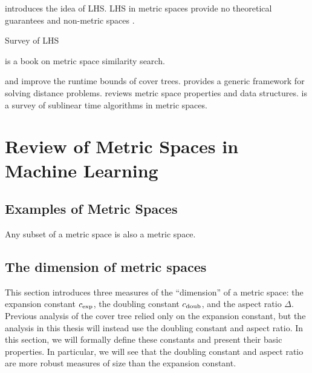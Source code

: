 \documentclass[../main.tex]{subfiles}
\newcommand{\aspect}[1]{\Delta}
\newcommand{\krnum}{c_\textnormal{exp}}
\newcommand{\doubnum}{c_\textnormal{doub}}
\begin{document}
\cite{gionis1999similarity} introduces the idea of LHS.
LHS in metric spaces \cite{tellez2010locality,novak2010locality} provide no theoretical guarantees and non-metric spaces \cite{mu2010non}.

Survey of LHS \cite{wang2014hashing} \cite{wang2016learning}

\cite{zezula2006similarity} is a book on metric space similarity search.

\cite{ram2009linear} and \cite{curtin2015plug} improve the runtime bounds of cover trees.
\cite{curtin2013tree} provides a generic framework for solving distance problems.
\cite{clarkson2006nearest} reviews metric space properties and data structures.
\cite{czumaj2010sublinear} is a survey of sublinear time algorithms in metric spaces.


\section{Review of Metric Spaces in Machine Learning}


\subsection{Examples of Metric Spaces}

\begin{example}
    Any subset of a metric space is also a metric space.
\end{example}


\subsection{The dimension of metric spaces}

This section introduces three measures of the ``dimension'' of a metric space:
the expansion constant $\krnum$, the doubling constant $\doubnum$, and the aspect ratio $\aspect{}$.
Previous analysis of the cover tree relied only on the expansion constant,
but the analysis in this thesis will instead use the doubling constant and aspect ratio.
In this section, we will formally define these constants and present their basic properties.
In particular, we will see that the doubling constant and aspect ratio are more robust measures of size than the expansion constant.
\end{document}
